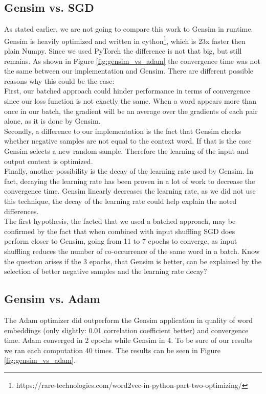 \subsection{Gensim vs. SGD}
As stated earlier, we are not going to compare this work to Gensim in runtime. Gensim is heavily optimized and written in cython\footnote{https://rare-technologies.com/word2vec-in-python-part-two-optimizing/}, which is 23x faster then plain Numpy. Since we used PyTorch the difference is not that big, but still remains. As shown in Figure \ref{fig:gensim_vs_adam} the convergence time was not the same between our implementation and Gensim. There are different possible reasons why this could be the case:\\ First, our batched approach could hinder performance in terms of convergence since our loss function is not exactly the same. When a word appears more than once in our batch, the gradient will be an average over the gradients of each pair alone, as it is done by Gensim.\\ Secondly, a difference to our implementation is the fact that Gensim checks whether negative samples are not equal to the context word. If that is the case Gensim selects a new random sample. Therefore the learning of the input and output context is optimized. \\Finally, another possibility is the decay of the learning rate used by Gensim. In fact, decaying the learning rate has been proven in a lot of work to decrease the convergence time. Gensim linearly decreases the learning rate, as we did not use this technique, the decay of the learning rate could help explain the noted differences. \\ The first hypothesis, the facted that we used a batched approach, may be confirmed by the fact that when combined with input shuffling SGD does perform closer to Gensim, going from 11 to 7 epochs to converge, as input shuffling reduces the number of co-occurrence of the same word in a batch. 
Know the question arises if the 3 epochs, that Gensim is better, can be explained by the selection of better negative samples and the learning rate decay?

\subsection{Gensim vs. Adam}
The Adam optimizer did outperform the Gensim application in quality of word embeddings (only slightly: 0.01 correlation coefficient better) and convergence time. Adam converged in 2 epochs while Gensim in 4. To be sure of our results we ran each computation 40 times. The results can be  seen in Figure \ref{fig:gensim_vs_adam}.

